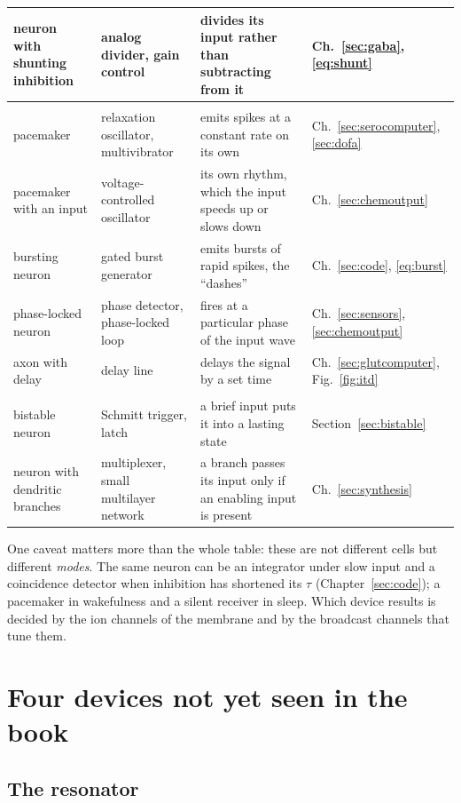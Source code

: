 \begin{center}
\begin{longtable}{>{\raggedright}p{3.1cm}>{\raggedright}p{3.3cm}>{\raggedright}p{4.7cm}>{\raggedright\arraybackslash}p{2.4cm}}
neuron with shunting inhibition & analog divider, gain control & divides its input rather than subtracting from it & Ch.~\ref{sec:gaba}, \eqref{eq:shunt} \\
\midrule
\multicolumn{4}{l}{\emph{Oscillators and time}} \\
pacemaker & relaxation oscillator, multivibrator & emits spikes at a constant rate on its own & Ch.~\ref{sec:serocomputer}, \ref{sec:dofa} \\
pacemaker with an input & voltage-controlled oscillator & its own rhythm, which the input speeds up or slows down & Ch.~\ref{sec:chemoutput} \\
bursting neuron & gated burst generator & emits bursts of rapid spikes, the ``dashes'' & Ch.~\ref{sec:code}, \eqref{eq:burst} \\
phase-locked neuron & phase detector, phase-locked loop & fires at a particular phase of the input wave & Ch.~\ref{sec:sensors}, \ref{sec:chemoutput} \\
axon with delay & delay line & delays the signal by a set time & Ch.~\ref{sec:glutcomputer}, Fig.~\ref{fig:itd} \\
\midrule
\multicolumn{4}{l}{\emph{Memory and switching}} \\
bistable neuron & Schmitt trigger, latch & a brief input puts it into a lasting state & Section~\ref{sec:bistable} \\
neuron with dendritic branches & multiplexer, small multilayer network & a branch passes its input only if an enabling input is present & Ch.~\ref{sec:synthesis} \\
\end{longtable}
\end{center}

One caveat matters more than the whole table: these are not different cells but different \emph{modes}. The same neuron can be an integrator under slow input and a coincidence detector when inhibition has shortened its $\tau$ (Chapter~\ref{sec:code}); a pacemaker in wakefulness and a silent receiver in sleep. Which device results is decided by the ion channels of the membrane and by the broadcast channels that tune them.

\section{Four devices not yet seen in the book}

\subsection{The resonator}
\label{sec:resonator}

